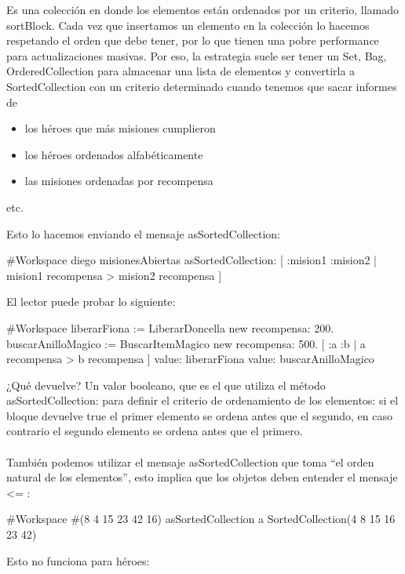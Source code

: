 \documentclass[a4paper,12pt]{book}
\begin{document}
Es una colección en donde los elementos están ordenados por un criterio, llamado sortBlock. Cada vez que
insertamos un elemento en la colección lo hacemos respetando el orden que debe tener, por lo que tienen
una pobre performance para actualizaciones masivas. Por eso, la estrategia suele ser tener un Set, Bag,
OrderedCollection para almacenar una lista de elementos y convertirla a SortedCollection con un criterio
determinado cuando tenemos que sacar informes de

\begin{itemize}
 \item los héroes que más misiones cumplieron
 \item los héroes ordenados alfabéticamente
 \item las misiones ordenadas por recompensa
\end{itemize}
etc. 

Esto lo hacemos enviando el mensaje asSortedCollection:

\begin{code}
#Workspace
diego misionesAbiertas asSortedCollection: 
    [ :mision1 :mision2 | mision1 recompensa > mision2 recompensa ]
\end{code}

El lector puede probar lo siguiente:

\begin{code}
#Workspace
liberarFiona := LiberarDoncella new recompensa: 200.
buscarAnilloMagico := BuscarItemMagico new recompensa: 500.
[ :a :b | a recompensa > b recompensa ] 
     value: liberarFiona value: buscarAnilloMagico
\end{code}

¿Qué devuelve? Un valor booleano, que es el que utiliza el método asSortedCollection: para definir el criterio
de ordenamiento de los elementos: si el bloque devuelve true el primer elemento se ordena antes que el segundo,
en caso contrario el segundo elemento se ordena antes que el primero.
\\
\\
También podemos utilizar el mensaje asSortedCollection que toma ``el orden natural de los elementos'',
esto implica que los objetos deben entender el mensaje \textless= :

\begin{code}
#Workspace
#(8 4 15 23 42 16) asSortedCollection 
  a SortedCollection(4 8 15 16 23 42)
\end{code}

Esto no funciona para héroes:
\end{document}
